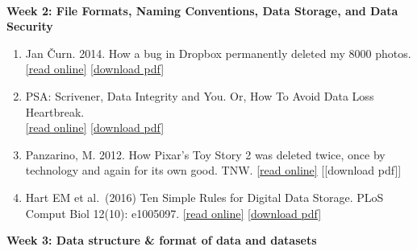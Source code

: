 \documentclass[
  12pt,
]{article}
\begin{document}
~

\textbf{Week 2: File Formats, Naming Conventions, Data Storage, and Data
Security}

\begin{enumerate}
\def\labelenumi{\arabic{enumi}.}
\item
  Jan Čurn. 2014. How a bug in Dropbox permanently deleted my 8000
  photos.\\
  \href{https://medium.com/@jancurn/how-bug-in-dropbox-permanently-deleted-my-8000-photos-cb7dcf13647b}{{[}read
  online{]}}
  \href{https://github.com/BrunaLab/LAS6292_DataManagement/blob/master/Assigned_Readings/Curn_2014.pdf}{{[}download
  pdf{]}}
\item
  PSA: Scrivener, Data Integrity and You. Or, How To Avoid Data Loss
  Heartbreak.\\
  \href{https://www.reddit.com/r/writing/comments/62hr7o/psa_scrivener_data_integrity_and_you_or_how_to/}{{[}read
  online{]}}
  \href{https://github.com/BrunaLab/LAS6292_DataManagement/blob/master/Assigned_Readings/Scrivener_PSA.pdf}{{[}download
  pdf{]}}
\item
  Panzarino, M. 2012. How Pixar's Toy Story 2 was deleted twice, once by
  technology and again for its own good. TNW.
  \href{https://thenextweb.com/media/2012/05/21/how-pixars-toy-story-2-was-deleted-twice-once-by-technology-and-again-for-its-own-good/}{{[}read
  online{]}} {[}{[}download pdf{]}{]}
\item
  Hart EM et al.~(2016) Ten Simple Rules for Digital Data Storage. PLoS
  Comput Biol 12(10): e1005097.
  \href{https://doi.org/10.1371/journal.pcbi.1005097}{{[}read online{]}}
  \href{https://github.com/BrunaLab/LAS6292_DataManagement/blob/master/Assigned_Readings/Hart_etal_2016.PDF}{{[}download
  pdf{]}}
\end{enumerate}

\textbf{Week 3: Data structure \& format of data and datasets }
\end{document}
